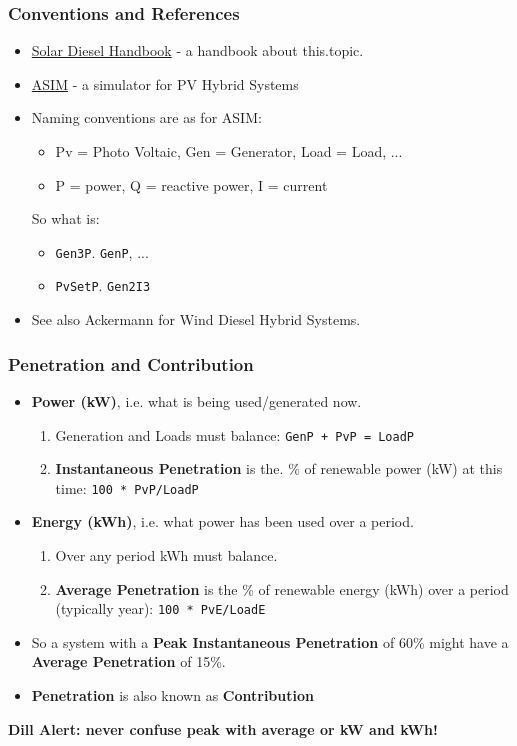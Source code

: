 \documentclass{beamer}
\def\dill#1{\textcolor{RawSienna}{\textbf{Dill Alert: #1}}}
\begin{document}
\begin{frame}\frametitle{Conventions and References}
  \begin{itemize}
  \item \href{http://www.powerwater.com.au/solardiesel}{Solar
      Diesel Handbook} - a handbook about this.topic.
    \pause
  \item \href{http://www.powerwater.com.au/solardiesel}{ASIM} - a
    simulator for PV Hybrid Systems
    \pause
  \item Naming conventions are as for ASIM: 
    \begin{itemize}
    \item Pv = Photo Voltaic, Gen = Generator, Load = Load, ...
    \item P = power, Q = reactive power, I = current
    \end{itemize}
    So what is:
    \begin{itemize}
    \item \texttt{Gen3P}. \texttt{GenP}, ...
    \item \texttt{PvSetP}. \texttt{Gen2I3}
    \end{itemize}
    \pause 
  \item See also Ackermann for Wind Diesel Hybrid Systems.
  \end{itemize}
\end{frame}

\begin{frame}\frametitle{Penetration and Contribution}
  \begin{itemize}
  \item \textbf{Power (kW)}, i.e. what is being used/generated now.
    \pause
    \begin{enumerate}
    \item Generation and Loads must balance: \texttt{GenP + PvP = LoadP}
    \item \textbf{Instantaneous Penetration} is the. 
      \% of renewable power (kW) at this time: \texttt{100 * PvP/LoadP}
    \end{enumerate}
    \pause
  \item \textbf{Energy (kWh)}, i.e. what power has been used over a
    period.
    \pause
    \begin{enumerate}
    \item Over any period kWh must balance.
    \item \textbf{Average Penetration} is the \% of renewable energy
      (kWh) over a period (typically year): \texttt{100 * PvE/LoadE}
    \end{enumerate}
    \pause
  \item So a system with a \textbf{Peak Instantaneous Penetration} of
    60\% might have a \textbf{Average Penetration} of 15\%.
  \item \textbf{Penetration} is also known as \textbf{Contribution}
    \pause
  \end{itemize}
  \dill{never confuse peak with average or kW and kWh!}

\end{frame}
\end{document}
